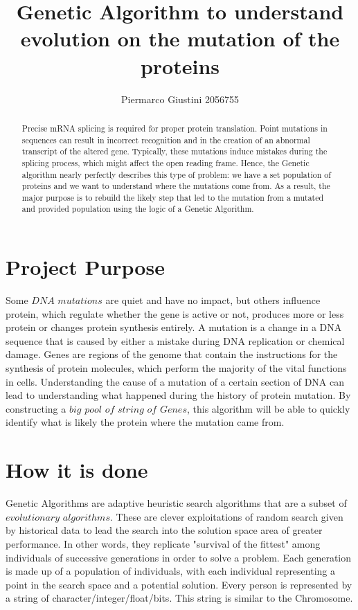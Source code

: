 \documentclass[letterpaper]{article} %
\title{Genetic Algorithm to understand evolution on the mutation of the proteins}
\author {
    Piermarco Giustini 2056755
}
\begin{document}
\maketitle

\begin{abstract}

\noindent Precise mRNA splicing is required for proper protein translation. Point mutations in sequences can result in incorrect recognition and in the creation of an abnormal transcript of the altered gene. Typically, these mutations induce mistakes during the splicing process, which might affect the open reading frame. Hence, the Genetic algorithm nearly perfectly describes this type of problem: we have a set population of proteins and we want to understand where the mutations come from. As a result, the major purpose is to rebuild the likely step that led to the mutation from a mutated and provided population using the logic of a Genetic Algorithm.

\end{abstract}

\section{Project Purpose}
Some $DNA$ $mutations$ are quiet and have no impact, but others influence protein, which regulate whether the gene is active or not, produces more or less protein or changes protein synthesis entirely. A mutation is a change in a DNA sequence that is caused by either a mistake during DNA replication or chemical damage. Genes are regions of the genome that contain the instructions for the synthesis of protein molecules, which perform the majority of the vital functions in cells. Understanding the cause of a mutation of a certain section of DNA can lead to understanding what happened during the history of protein mutation.
By constructing a $big$ $pool$ $of$ $string$ $of$ $Genes$, this algorithm will be able to quickly identify what is likely the protein where the mutation came from.

\section{How it is done}
Genetic Algorithms are adaptive heuristic search algorithms that are a subset of $evolutionary$ $algorithms$. These are clever exploitations of random search given by historical data to lead the search into the solution space area of greater performance. 
In other words, they replicate "survival of the fittest" among individuals of successive generations in order to solve a problem. 
Each generation is made up of a population of individuals, with each individual representing a point in the search space and a potential solution. Every person is represented by a string of character/integer/float/bits. This string is similar to the Chromosome. 
\end{document}
